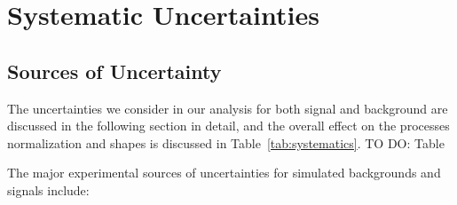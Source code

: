 \chapter{Systematic Uncertainties}
\label{ch:sys_unc}

\section{Sources of Uncertainty}

The uncertainties we consider in our analysis for both signal and background are discussed in the following section in detail, 
and the overall effect on the processes normalization and shapes is discussed in Table~\ref{tab:systematics}. {\color{red} TO DO: Table} 

The major experimental sources of uncertainties for simulated backgrounds and signals include:
